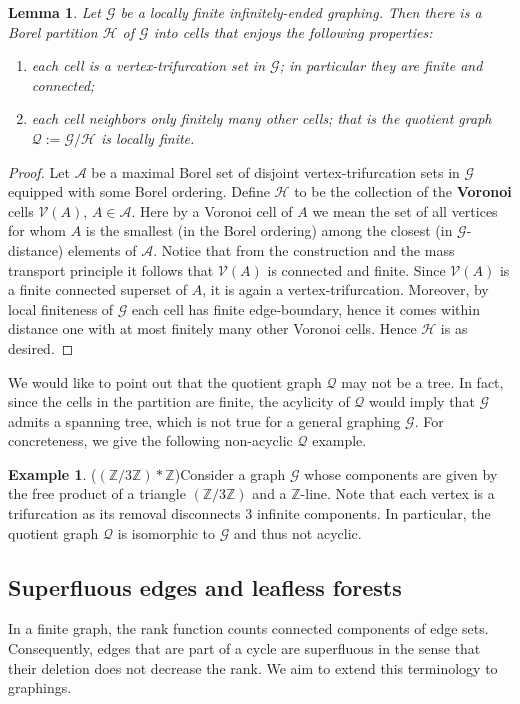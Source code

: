 \documentclass{article}
\theoremstyle{plain}
\newtheorem{lem}[thm]{Lemma}
\theoremstyle{definition}
\newtheorem{ex}[thm]{Example}
\newcommand{\Z}{\mathbb{Z}}
\newcommand{\cA}{\mathcal{A}}
\newcommand{\cG}{\mathcal{G}}
\newcommand{\cV}{\mathcal{V}}
\newcommand{\cQ}{\mathcal{Q}}
\newcommand{\cH}{\mathcal{H}}
\begin{document}
\begin{lem}\label{lem:cells}
    Let $\cG$ be a locally finite infinitely-ended graphing. Then there is a Borel partition $\cH$ of $\cG$ into cells that enjoys the following properties:
    \begin{enumerate}
        \item each cell is a vertex-trifurcation set in $\cG$; in particular they are finite and connected;
        \item each cell neighbors only finitely many other cells; that is the quotient graph $\cQ:=\cG/\cH$ is locally finite. 
    \end{enumerate}
\end{lem}
\begin{proof}
    Let $\cA$ be a maximal Borel set of disjoint vertex-trifurcation sets in $\cG$ equipped with some Borel ordering. Define $\cH$ to be the collection of the \textbf{Voronoi} cells $\cV(A)$, $A\in \cA$. Here by a Voronoi cell of $A$ we mean the set of all vertices for whom $A$ is the smallest (in the Borel ordering) among the closest (in $\cG$-distance) elements of $\cA$. Notice that from the construction and the mass transport principle it follows that $\cV(A)$ is connected and finite. Since $\cV(A)$ is a finite connected superset of $A$, it is again a vertex-trifurcation. Moreover, by local finiteness of $\cG$ each cell has finite edge-boundary, hence it comes within distance one with at most finitely many other Voronoi cells. Hence $\cH$ is as desired.
\end{proof}

We would like to point out that the quotient graph $\mathcal{Q}$ may not be a tree. In fact, since the cells in the partition are finite, the acylicity of $\cQ$ would imply that $\cG$ admits a spanning tree, which is not true for a general graphing $\cG$. For concreteness, we give the following non-acyclic $\mathcal{Q}$ example.
\begin{ex}($(\Z/3\Z)* \Z$)\label{ex:nontree}
    Consider a graph $\cG$ whose components are given by the free product of a triangle $(\Z/3\Z)$ and a $\Z$-line. Note that each vertex is a trifurcation as its removal disconnects 3 infinite components. In particular, the quotient graph $\cQ$ is isomorphic to $\cG$ and thus not acyclic.
\end{ex}


\subsection{Superfluous edges and leafless forests}\label{subsec:superfluous_edges}
In a finite graph, the rank function counts connected components of edge sets. Consequently, edges that are part of a cycle are superfluous in the sense that their deletion does not decrease the rank. We aim to extend this terminology to graphings. 
\end{document}
